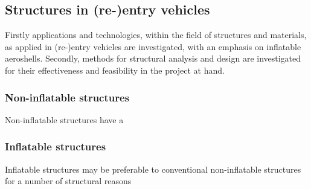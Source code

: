 \subsection{Structures in (re-)entry vehicles}\label{sec:struc}
Firstly applications and technologies, within the field of structures and materials, as applied in (re-)entry vehicles are investigated, with an emphasis on inflatable aeroshells. Secondly, methods for structural analysis and design are investigated for their effectiveness and feasibility in the project at hand.

\subsubsection{Non-inflatable structures}
Non-inflatable structures have a

\subsubsection{Inflatable structures}
Inflatable structures may be preferable to conventional non-inflatable structures for a number of structural reasons 




